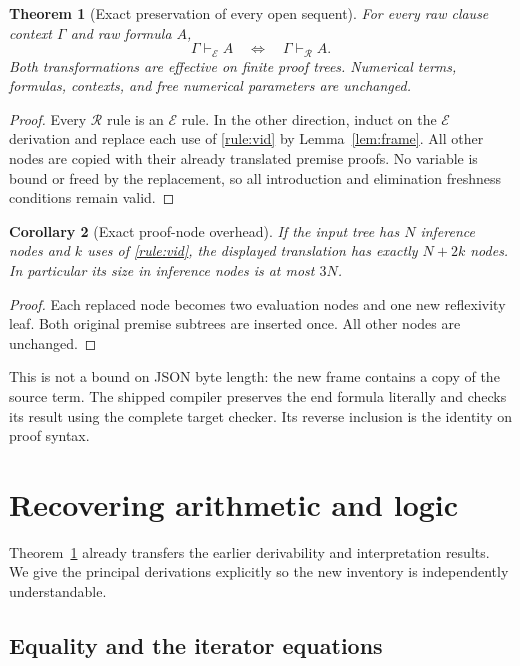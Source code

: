 \documentclass[11pt]{article}
\newtheorem{theorem}{Theorem}[section]
\newtheorem{corollary}[theorem]{Corollary}
\theoremstyle{definition}
\newcommand{\Raw}{\mathcal R}
\newcommand{\Old}{\mathcal E}
\begin{document}
\begin{theorem}[Exact preservation of every open sequent]
\label{thm:raw-equivalence}
For every raw clause context $\Gamma$ and raw formula $A$,
\[
                 \Gamma\vdash_{\Old} A
                 \quad\Longleftrightarrow\quad
                 \Gamma\vdash_{\Raw} A.
\]
Both transformations are effective on finite proof trees. Numerical terms,
formulas, contexts, and free numerical parameters are unchanged.
\end{theorem}
\begin{proof}
Every $\Raw$ rule is an $\Old$ rule. In the other direction, induct on
the $\Old$ derivation and replace each use of \eqref{rule:vid} by
Lemma~\ref{lem:frame}. All other nodes are copied with their already
translated premise proofs. No variable is bound or freed by the replacement,
so all introduction and elimination freshness conditions remain valid.
\end{proof}

\begin{corollary}[Exact proof-node overhead]
\label{cor:overhead}
If the input tree has $N$ inference nodes and $k$ uses of
\eqref{rule:vid}, the displayed translation has exactly $N+2k$ nodes.
In particular its size in inference nodes is at most $3N$.
\end{corollary}
\begin{proof}
Each replaced node becomes two evaluation nodes and one new reflexivity
leaf. Both original premise subtrees are inserted once. All other nodes
are unchanged.
\end{proof}

This is not a bound on JSON byte length: the new frame contains a copy of
the source term. The shipped compiler preserves the end formula literally
and checks its result using the complete target checker. Its reverse
inclusion is the identity on proof syntax.

\section{Recovering arithmetic and logic}
\label{sec:recovery}

Theorem~\ref{thm:raw-equivalence} already transfers the earlier derivability
and interpretation results. We give the principal derivations explicitly
so the new inventory is independently understandable.

\subsection{Equality and the iterator equations}
\end{document}
